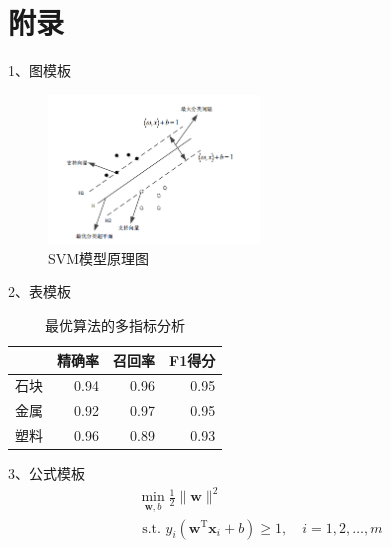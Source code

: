 \documentclass{article}
\begin{document}

\newpage{}
\appendix
\section{附录}
\begin{appendices}
    1、图模板
    \begin{figure}[htpb]
        \centering
        \includegraphics[width=0.5\textwidth]{svm.png}
        \caption{SVM模型原理图}
        \label{fig:svm}
    \end{figure}

    2、表模板
    \begin{table}[htpb]
        \caption{最优算法的多指标分析}
        \begin{center}\label{table:score}
            \begin{tabular}{|c|r|r|r|}
                \hline
                     & \multicolumn{1}{c|}{精确率} & \multicolumn{1}{c|}{召回率} & \multicolumn{1}{c|}{F1得分} \\ \hline
                石块 & 0.94                        & 0.96                        & 0.95                        \\ \hline
                金属 & 0.92                        & 0.97                        & 0.95                        \\ \hline
                塑料 & 0.96                        & 0.89                        & 0.93                        \\ \hline
            \end{tabular}
        \end{center}
    \end{table}

    3、公式模板
    \begin{equation}\label{eq:svmsuper}
        \begin{array}{l}
            \min _{\boldsymbol{w}, b} \frac{1}{2}\|\boldsymbol{w}\|^{2} \\
            \text { s.t. } y_{i}\left(\boldsymbol{w}^{\mathrm{T}} \boldsymbol{x}_{i}+b\right) \geqslant 1, \quad i=1,2, \ldots, m
        \end{array}
    \end{equation}



\end{appendices}
\end{document}
